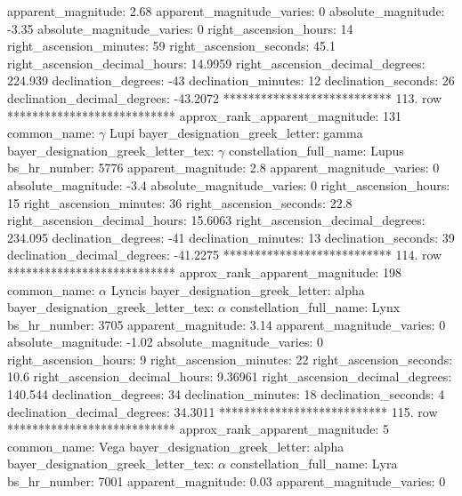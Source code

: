                 apparent_magnitude: 2.68
         apparent_magnitude_varies: 0
                absolute_magnitude: -3.35
         absolute_magnitude_varies: 0
             right_ascension_hours: 14
           right_ascension_minutes: 59
           right_ascension_seconds: 45.1
     right_ascension_decimal_hours: 14.9959
   right_ascension_decimal_degrees: 224.939
               declination_degrees: -43
               declination_minutes: 12
               declination_seconds: 26
       declination_decimal_degrees: -43.2072
*************************** 113. row ***************************
    approx_rank_apparent_magnitude: 131
                       common_name: $\gamma$ Lupi
    bayer_designation_greek_letter: gamma
bayer_designation_greek_letter_tex: $\gamma$
           constellation_full_name: Lupus
                      bs_hr_number: 5776
                apparent_magnitude: 2.8
         apparent_magnitude_varies: 0
                absolute_magnitude: -3.4
         absolute_magnitude_varies: 0
             right_ascension_hours: 15
           right_ascension_minutes: 36
           right_ascension_seconds: 22.8
     right_ascension_decimal_hours: 15.6063
   right_ascension_decimal_degrees: 234.095
               declination_degrees: -41
               declination_minutes: 13
               declination_seconds: 39
       declination_decimal_degrees: -41.2275
*************************** 114. row ***************************
    approx_rank_apparent_magnitude: 198
                       common_name: $\alpha$ Lyncis
    bayer_designation_greek_letter: alpha
bayer_designation_greek_letter_tex: $\alpha$
           constellation_full_name: Lynx
                      bs_hr_number: 3705
                apparent_magnitude: 3.14
         apparent_magnitude_varies: 0
                absolute_magnitude: -1.02
         absolute_magnitude_varies: 0
             right_ascension_hours: 9
           right_ascension_minutes: 22
           right_ascension_seconds: 10.6
     right_ascension_decimal_hours: 9.36961
   right_ascension_decimal_degrees: 140.544
               declination_degrees: 34
               declination_minutes: 18
               declination_seconds: 4
       declination_decimal_degrees: 34.3011
*************************** 115. row ***************************
    approx_rank_apparent_magnitude: 5
                       common_name: Vega
    bayer_designation_greek_letter: alpha
bayer_designation_greek_letter_tex: $\alpha$
           constellation_full_name: Lyra
                      bs_hr_number: 7001
                apparent_magnitude: 0.03
         apparent_magnitude_varies: 0
